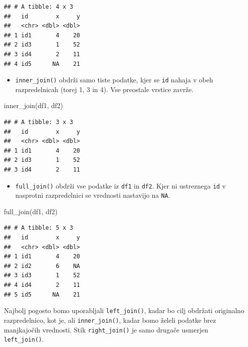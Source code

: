 \documentclass[
]{book}
\newenvironment{Shaded}{\begin{snugshade}}{\end{snugshade}}
\newcommand{\FunctionTok}[1]{\textcolor[rgb]{0.00,0.00,0.00}{#1}}
\newcommand{\NormalTok}[1]{#1}
\providecommand{\tightlist}{%
  \setlength{\itemsep}{0pt}\setlength{\parskip}{0pt}}
\begin{document}
\begin{verbatim}
## # A tibble: 4 x 3
##   id        x     y
##   <chr> <dbl> <dbl>
## 1 id1       4    20
## 2 id3       1    52
## 3 id4       2    11
## 4 id5      NA    21
\end{verbatim}

\begin{itemize}
\tightlist
\item
  \texttt{inner\_join()} obdrži samo tiste podatke, kjer se \texttt{id} nahaja v obeh razpredelnicah (torej 1, 3 in 4). Vse preostale vrstice zavrže.
\end{itemize}

\begin{Shaded}
\begin{Highlighting}[]
\FunctionTok{inner\_join}\NormalTok{(df1, df2)}
\end{Highlighting}
\end{Shaded}

\begin{verbatim}
## # A tibble: 3 x 3
##   id        x     y
##   <chr> <dbl> <dbl>
## 1 id1       4    20
## 2 id3       1    52
## 3 id4       2    11
\end{verbatim}

\begin{itemize}
\tightlist
\item
  \texttt{full\_join()} obdrži vse podatke iz \texttt{df1} in \texttt{df2}. Kjer ni ustreznega \texttt{id} v nasprotni razpredelnici se vrednosti nastavijo na \texttt{NA}.
\end{itemize}

\begin{Shaded}
\begin{Highlighting}[]
\FunctionTok{full\_join}\NormalTok{(df1, df2)}
\end{Highlighting}
\end{Shaded}

\begin{verbatim}
## # A tibble: 5 x 3
##   id        x     y
##   <chr> <dbl> <dbl>
## 1 id1       4    20
## 2 id2       6    NA
## 3 id3       1    52
## 4 id4       2    11
## 5 id5      NA    21
\end{verbatim}

Najbolj pogosto bomo uporabljali \texttt{left\_join()}, kadar bo cilj obdržati originalno razpredelnico, kot je, ali \texttt{inner\_join()}, kadar bomo želeli podatke brez manjkajočih vrednosti. Stik \texttt{right\_join()} je samo drugače usmerjen \texttt{left\_join()}.
\end{document}
